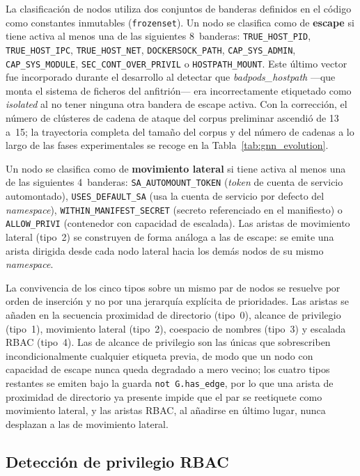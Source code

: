 La clasificación de nodos utiliza dos conjuntos de banderas definidos en el código
como constantes inmutables (\texttt{frozenset}). Un nodo se clasifica como de
\textbf{escape} si tiene activa al menos una de las siguientes 8~banderas:
\texttt{TRUE\_HOST\_PID}, \texttt{TRUE\_HOST\_IPC}, \texttt{TRUE\_HOST\_NET},
\texttt{DOCKERSOCK\_PATH}, \texttt{CAP\_SYS\_ADMIN}, \texttt{CAP\_SYS\_MODULE},
\texttt{SEC\_CONT\_OVER\_PRIVIL} o \texttt{HOSTPATH\_MOUNT}. Este último vector fue
incorporado durante el desarrollo al detectar que \textit{badpods\_hostpath} —que monta
el sistema de ficheros del anfitrión— era incorrectamente etiquetado como
\textit{isolated} al no tener ninguna otra bandera de escape activa. Con la corrección,
el número de clústeres de cadena de ataque del corpus preliminar ascendió de 13
a~15; la trayectoria completa del tamaño del corpus y del número de cadenas a lo
largo de las fases experimentales se recoge en la
Tabla~\ref{tab:gnn_evolution}.

Un nodo se clasifica como de \textbf{movimiento lateral} si tiene activa al menos una
de las siguientes 4~banderas: \texttt{SA\_AUTOMOUNT\_TOKEN} (\textit{token} de cuenta de servicio
automontado), \texttt{USES\_DEFAULT\_SA} (usa la cuenta de servicio por defecto del
\textit{namespace}), \texttt{WITHIN\_MANIFEST\_SECRET} (secreto referenciado en el
manifiesto) o \texttt{ALLOW\_PRIVI} (contenedor con capacidad de escalada). Las aristas
de movimiento lateral (tipo~2) se construyen de forma análoga a las de escape: se emite
una arista dirigida desde cada nodo lateral hacia los demás nodos de su mismo
\textit{namespace}.

La convivencia de los cinco tipos sobre un mismo par de nodos se resuelve por orden de
inserción y no por una jerarquía explícita de prioridades. Las aristas se añaden en la
secuencia proximidad de directorio (tipo~0), alcance de privilegio (tipo~1), movimiento
lateral (tipo~2), coespacio de nombres (tipo~3) y escalada \ac{RBAC} (tipo~4). Las de
alcance de privilegio son las únicas que sobrescriben incondicionalmente cualquier
etiqueta previa, de modo que un nodo con capacidad de escape nunca queda degradado a
mero vecino; los cuatro tipos restantes se emiten bajo la guarda \texttt{not
G.has\_edge}, por lo que una arista de proximidad de directorio ya presente impide que
el par se reetiquete como movimiento lateral, y las aristas \ac{RBAC}, al añadirse en
último lugar, nunca desplazan a las de movimiento lateral.

\subsection{Detección de privilegio \acs{RBAC}}

